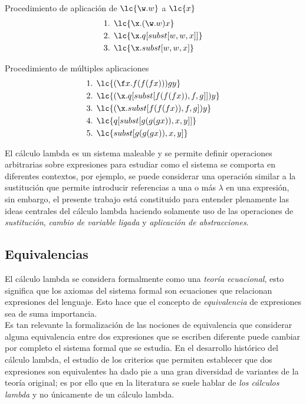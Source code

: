 \begin{ejemplo} Procedimiento de aplicación de \(\lc{\w.w}\) a \(\lc{x}\)
  \label{ejemplo:aplicacion4}
  \begin{align*}
    \text{1. } &\lc{\x.(\w.w)x} \\
    \text{2. } &\lc{\x.q[subst[w,w,x]]} \\
    \text{3. } &\lc{\x.subst[w,w,x]}
  \end{align*}
\end{ejemplo}

\begin{ejemplo} Procedimiento de múltiples aplicaciones
  \label{ejemplo:aplicacion5}
  \begin{align*}
    \text{1. } &\lc{(\f x.f(f(f x)))g y} \\
    \text{2. } &\lc{(\x.q[subst[f(f(f x)), f, g]]) y} \\
    \text{3. } &\lc{(\x.subst[f(f(f x)), f, g]) y} \\
    \text{4. } &\lc{q[subst[g(g(g x)), x, y]]} \\
    \text{5. } &\lc{subst[g(g(g x)), x, y]}
  \end{align*}
\end{ejemplo}

El cálculo lambda es un sistema maleable y se permite definir operaciones
arbitrarias sobre expresiones para estudiar como el sistema se comporta en
diferentes contextos, por ejemplo, se puede considerar una operación similar a
la sustitución que permite introducir referencias a una o más \(\lambda\) en una
expresión, sin embargo, el presente trabajo está constituido para entender
plenamente las ideas centrales del cálculo lambda haciendo solamente uso de las
operaciones de \emph{sustitución}, \emph{cambio de variable ligada} y
\emph{aplicación de abstracciones}. \\

\subsection{Equivalencias}

El cálculo lambda se considera formalmente como una \emph{teoría ecuacional},
esto significa que los axiomas del sistema formal son ecuaciones que relacionan
expresiones del lenguaje. Esto hace que el concepto de \emph{equivalencia} de
expresiones sea de suma importancia. \\

Es tan relevante la formalización de las nociones de equivalencia que considerar
alguna equivalencia entre dos expresiones que se escriben diferente puede cambiar
por completo el sistema formal que se estudia. En el desarrollo histórico del
cálculo lambda, el estudio de los criterios que permiten establecer que dos
expresiones son equivalentes ha dado pie a una gran diversidad de variantes de la
teoría original; es por ello que en la literatura se suele hablar de \emph{los
cálculos lambda} y no únicamente de un cálculo lambda. \\

